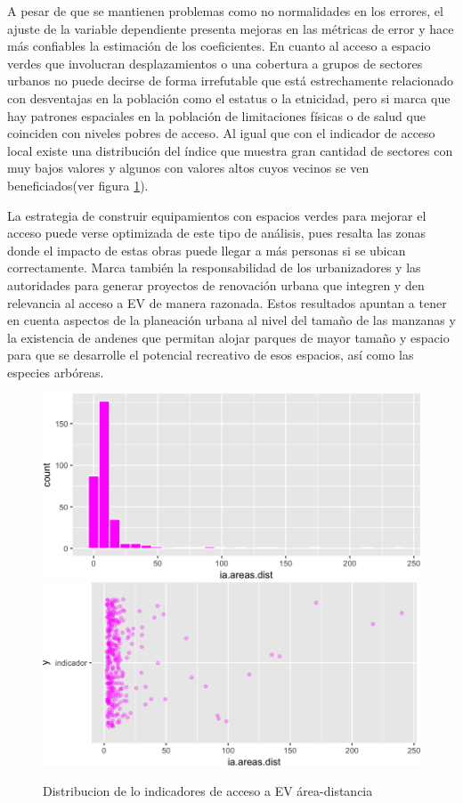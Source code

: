 \documentclass[12pt,]{book}
\begin{document}
A pesar de que se mantienen problemas como no normalidades en los
errores, el ajuste de la variable dependiente presenta mejoras en las
métricas de error y hace más confiables la estimación de los
coeficientes. En cuanto al acceso a espacio verdes que involucran
desplazamientos o una cobertura a grupos de sectores urbanos no puede
decirse de forma irrefutable que está estrechamente relacionado con
desventajas en la población como el estatus o la etnicidad, pero si
marca que hay patrones espaciales en la población de limitaciones
físicas o de salud que coinciden con niveles pobres de acceso. Al igual
que con el indicador de acceso local existe una distribución del índice
que muestra gran cantidad de sectores con muy bajos valores y algunos
con valores altos cuyos vecinos se ven beneficiados(ver figura
\ref{fig:hist-areasdist}).

La estrategia de construir equipamientos con espacios verdes para
mejorar el acceso puede verse optimizada de este tipo de análisis, pues
resalta las zonas donde el impacto de estas obras puede llegar a más
personas si se ubican correctamente. Marca también la responsabilidad de
los urbanizadores y las autoridades para generar proyectos de renovación
urbana que integren y den relevancia al acceso a EV de manera razonada.
Estos resultados apuntan a tener en cuenta aspectos de la planeación
urbana al nivel del tamaño de las manzanas y la existencia de andenes
que permitan alojar parques de mayor tamaño y espacio para que se
desarrolle el potencial recreativo de esos espacios, así como las
especies arbóreas.

\begin{figure}
\includegraphics[width=1\linewidth]{tesis-unigis_files/figure-latex/hist-areasdist-1} \includegraphics[width=1\linewidth]{tesis-unigis_files/figure-latex/hist-areasdist-2} \caption{Distribucion de lo indicadores de acceso a EV área-distancia }\label{fig:hist-areasdist}
\end{figure}
\end{document}
